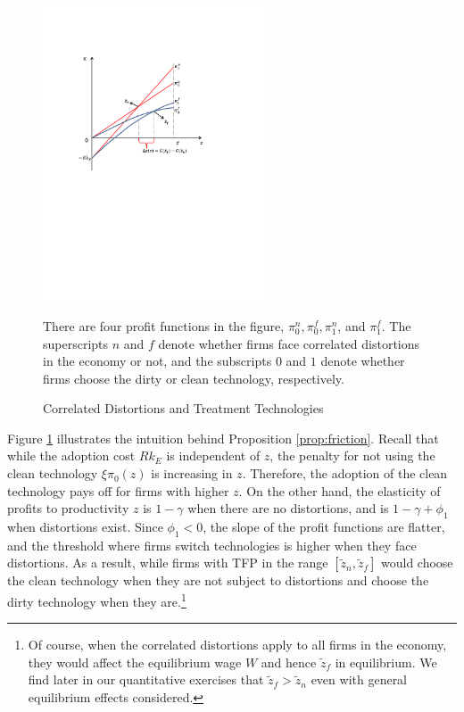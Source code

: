\documentclass[AEJ]{AEA}
\begin{document}
\begin{figure}[t]
\begin{center}
    \includegraphics[width=0.60\textwidth]{./Figures/prod_tax_effect.pdf}
    \caption{Correlated Distortions and Treatment Technologies}
    \label{fig:constantp}
    \begin{figurenotes}
        There are four profit functions in the figure, $\pi_0^n, \pi_0^f, \pi_1^n$, and $\pi_1^f$. The superscripts $n$ and $f$ denote whether firms face correlated distortions in the economy or not, and the subscripts $0$ and $1$ denote whether firms choose the dirty or clean technology, respectively.
    \end{figurenotes}
\end{center}
\end{figure}
\noindent Figure \ref{fig:constantp} illustrates the intuition behind Proposition \ref{prop:friction}. Recall that while the adoption cost $Rk_E$ is independent of $z$, the penalty for not using the clean technology $\xi \pi_0(z)$ is increasing in $z$. Therefore, the adoption of the clean technology pays off for firms with higher $z$. On the other hand, the elasticity of profits to productivity $z$ is $1-\gamma$ when there are no distortions, and is $1-\gamma+\phi_1$ when distortions exist. Since $\phi_1 < 0$, the slope of the profit functions are flatter, and the threshold where firms switch technologies is higher when they face distortions. As a result, while firms with TFP in the range $[\tilde{z}_n, \tilde{z}_f]$ would choose the clean technology when they are not subject to distortions and choose the dirty technology when they are.\footnote{Of course, when the correlated distortions apply to all firms in the economy, they would affect the equilibrium wage $W$ and hence $\tilde{z}_f$ in equilibrium. We find later in our quantitative exercises that $\tilde{z}_f > \tilde{z}_n$ even with general equilibrium effects considered.}
\end{document}
